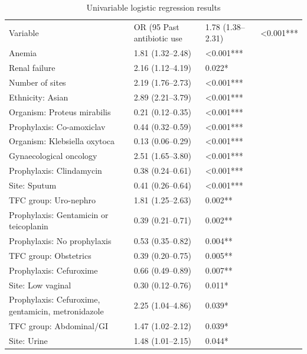 \begin{table}[htbp]
\caption{Univariable logistic regression results}
\label{tab:univar_lr}
\begin{tabular}{lll}
\toprule
Variable & OR (95%
\midrule
Past antibiotic use & 1.78 (1.38–2.31) & <0.001*** \\
Anemia & 1.81 (1.32–2.48) & <0.001*** \\
Renal failure & 2.16 (1.12–4.19) & 0.022* \\
Number of sites & 2.19 (1.76–2.73) & <0.001*** \\
Ethnicity: Asian & 2.89 (2.21–3.79) & <0.001*** \\
Organism: Proteus mirabilis & 0.21 (0.12–0.35) & <0.001*** \\
Prophylaxis: Co-amoxiclav & 0.44 (0.32–0.59) & <0.001*** \\
Organism: Klebsiella oxytoca & 0.13 (0.06–0.29) & <0.001*** \\
Gynaecological oncology & 2.51 (1.65–3.80) & <0.001*** \\
Prophylaxis: Clindamycin & 0.38 (0.24–0.61) & <0.001*** \\
Site: Sputum & 0.41 (0.26–0.64) & <0.001*** \\
TFC group: Uro-nephro & 1.81 (1.25–2.63) & 0.002** \\
Prophylaxis: Gentamicin or teicoplanin & 0.39 (0.21–0.71) & 0.002** \\
Prophylaxis: No prophylaxis & 0.53 (0.35–0.82) & 0.004** \\
TFC group: Obstetrics & 0.39 (0.20–0.75) & 0.005** \\
Prophylaxis: Cefuroxime & 0.66 (0.49–0.89) & 0.007** \\
Site: Low vaginal & 0.30 (0.12–0.76) & 0.011* \\
Prophylaxis: Cefuroxime, gentamicin, metronidazole & 2.25 (1.04–4.86) & 0.039* \\
TFC group: Abdominal/GI & 1.47 (1.02–2.12) & 0.039* \\
Site: Urine & 1.48 (1.01–2.15) & 0.044* \\
\bottomrule
\end{tabular}
\end{table}
